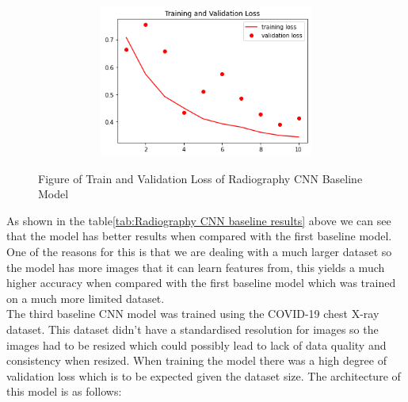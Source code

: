  \begin{figure}[H]
    \centering
    \includegraphics[width=1\textwidth,height=5cm,keepaspectratio]{Images/RadiographyCNNBaselineTrainAndValLoss.png}\\
    \caption{Figure of Train and Validation Loss of Radiography CNN Baseline Model}
    \label{fig:Second CNN Baseline Train and Validation Loss}
\end{figure}
As shown in the table\ref{tab:Radiography CNN baseline results} above we can see that the model has better results when compared with the first baseline model. One of the reasons for this is that we are dealing with a much larger dataset so the model has more images that it can learn features from, this yields a much higher accuracy when compared with the first baseline model which was trained on a much more limited dataset.
\\
The third baseline CNN model was trained using the COVID-19 chest X-ray dataset. This dataset didn't have a standardised resolution for images so the images had to be resized which could possibly lead to lack of data quality and consistency when resized.  When training the model there was a high degree of validation loss which is to be expected given the dataset size. The architecture of this model is as follows:
